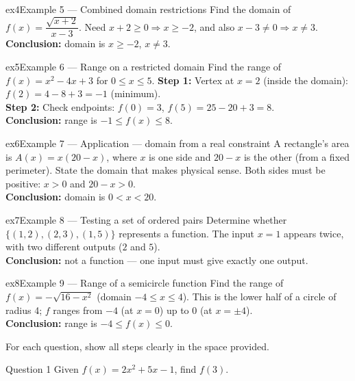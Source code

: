 \documentclass[11pt]{article}
\begin{document}
\begin{example}{ex4}{Example 5 --- Combined domain restrictions}
Find the domain of $f(x)=\dfrac{\sqrt{x+2}}{x-3}$.\soln
Need $x+2\geq0\Rightarrow x\geq-2$, and also $x-3\neq0\Rightarrow x\neq3$.\\[3pt]\textbf{Conclusion:} domain is $x\geq-2$, $x\neq3$.
\end{example}

\begin{example}{ex5}{Example 6 --- Range on a restricted domain}
Find the range of $f(x)=x^2-4x+3$ for $0\leq x\leq5$.\soln
\textbf{Step 1:} Vertex at $x=2$ (inside the domain): $f(2)=4-8+3=-1$ (minimum).\\[3pt]
\textbf{Step 2:} Check endpoints: $f(0)=3$, $f(5)=25-20+3=8$.\\[3pt]\textbf{Conclusion:} range is $-1\leq f(x)\leq8$.
\end{example}

\begin{example}{ex6}{Example 7 --- Application --- domain from a real constraint}
A rectangle's area is $A(x)=x(20-x)$, where $x$ is one side and $20-x$ is the other (from a fixed perimeter). State the domain that makes physical sense.\soln
Both sides must be positive: $x>0$ and $20-x>0$.\\[3pt]\textbf{Conclusion:} domain is $0<x<20$.
\end{example}

\begin{example}{ex7}{Example 8 --- Testing a set of ordered pairs}
Determine whether $\{(1,2),(2,3),(1,5)\}$ represents a function.\soln
The input $x=1$ appears twice, with two different outputs ($2$ and $5$).\\[3pt]\textbf{Conclusion:} not a function --- one input must give exactly one output.
\end{example}

\begin{example}{ex8}{Example 9 --- Range of a semicircle function}
Find the range of $f(x)=-\sqrt{16-x^2}$ (domain $-4\leq x\leq4$).\soln
This is the lower half of a circle of radius 4; $f$ ranges from $-4$ (at $x=0$) up to $0$ (at $x=\pm4$).\\[3pt]\textbf{Conclusion:} range is $-4\leq f(x)\leq0$.
\end{example}

\clearpage
{}
For each question, show all steps clearly in the space provided.

\begin{qbox}{Question 1}
Given $f(x)=2x^2+5x-1$, find $f(3)$.\workspace{2.4cm}
\end{qbox}
\end{document}
